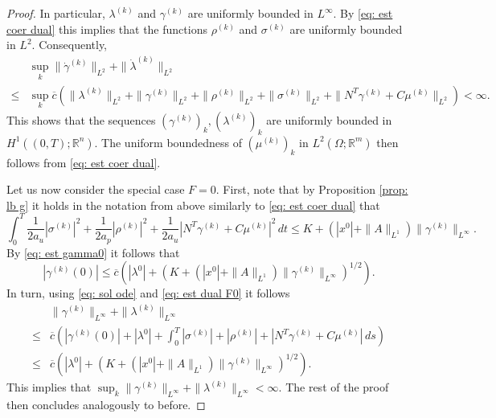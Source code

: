 \documentclass[10pt,a4paper]{amsart}
\newcommand{\R}{\mathbb R}
\begin{document}
\begin{proof}
In particular, $\lambda^{(k)}$ and $\gamma^{(k)}$ are uniformly bounded in $L^{\infty}$. By \eqref{eq: est coer dual} this implies that the functions $\rho^{(k)}$ and $\sigma^{(k)}$ are uniformly bounded in $L^2$. Consequently, 
\begin{align*} 
&\sup_k \| \dot{\gamma}^{(k)} \|_{L^2} + \| \dot{\lambda}^{(k)} \|_{L^2}  \\ \leq &\sup_k \overline{c} \left( \| \lambda^{(k)} \|_{L^2} + \| \gamma^{(k)} \|_{L^2} + \| \rho^{(k)} \|_{L^2} + \| \sigma^{(k)} \|_{L^2} +  \| N^T \gamma^{(k)} + C \mu^{(k)}\|_{L^2} \right) < \infty.
\end{align*}
This shows that the sequences $(\gamma^{(k)})_k, (\lambda^{(k)})_k$ are uniformly bounded in $H^1((0,T);\R^n)$. The uniform boundedness of $(\mu^{(k)})_k$ in $L^2(\Omega;\R^m)$ then follows from \eqref{eq: est coer dual}. 

Let us now consider the special case $F=0$. 
First, note that by Proposition \ref{prop: lb g} it holds in the notation from above similarly to \eqref{eq: est coer dual} that
\begin{equation} \label{eq: est dual F0}
\int_0^T \frac1{2a_u} |\sigma^{(k)}|^2 + \frac1{2a_p} |\rho^{(k)} |^2 + \frac1{2a_u} |N^T\gamma^{(k)} + C \mu^{(k)}|^2  \, dt \leq K + (|x^0| + \| A \|_{L^1}) \| \gamma^{(k)} \|_{L^{\infty}}. 
\end{equation}
By \eqref{eq: est gamma0} it follows that
\[
|\gamma^{(k)}(0)| \leq \overline{c} \left( |\lambda^0| + ( K + (|x^0| + \| A \|_{L^1}) \| \gamma^{(k)} \|_{L^{\infty}})^{1/2} \right).
\]
In turn, using \eqref{eq: sol ode} and \eqref{eq: est dual F0} it follows
\begin{align}
     &\| \gamma^{(k)} \|_{L^{\infty}} + \| \lambda^{(k)} \|_{L^{\infty}} \\
    \leq &\overline{c} \left( |\gamma^{(k)}(0)| +  |\lambda^0| + \int_0^T |\sigma^{(k)}| + |\rho^{(k)}| + |N^T\gamma^{(k)} + C \mu^{(k)}| \, ds \right) \\
    \leq &\overline{c} \left( |\lambda^0| + ( K + (|x^0| + \| A \|_{L^1}) \| \gamma^{(k)} \|_{L^{\infty}})^{1/2} \right).
\end{align}
This implies that $\sup_k \| \gamma^{(k)} \|_{L^{\infty}} + \| \lambda^{(k)} \|_{L^{\infty}} < \infty$. The rest of the proof then concludes analogously to before.


\end{proof}
\end{document}
